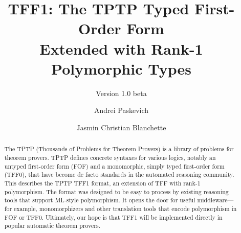 \documentclass[draft,a4paper]{llncs}
\begin{document}
\title{
TFF1: The TPTP Typed First-Order Form \\ Extended with Rank-1 Polymorphic Types}
\subtitle{Version 1.0 beta}

\author{
Andrei Paskevich \and Jasmin Christian Blanchette
}


\maketitle

\begin{abstract}
The TPTP (Thousands of Problems for Theorem Provers) is a library of problems
for theorem provers. TPTP defines concrete syntaxes for various logics, notably
an untyped first-order form (FOF) and a monomorphic, simply typed first-order
form (TFF0), that have become de facto standards in the automated reasoning
community. This \paper{} describes the TPTP TFF1 format, an extension of TFF
with rank-1 polymorphism. The format was designed to be easy to process
by existing reasoning tools that support ML-style polymorphism. It opens the
door for useful middleware---for example, monomorphizers and other translation
tools that encode polymorphism in FOF or TFF0. Ultimately, our hope is that TFF1
will be implemented directly in popular automatic theorem provers.
\end{abstract}













\end{document}
